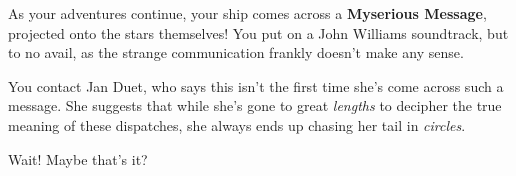 As your adventures continue, your ship comes across a \textbf{Myserious
Message}, projected onto the stars themselves! You put on a John
Williams soundtrack, but to no avail, as the strange communication
frankly doesn't make any sense.

You contact Jan Duet, who says this isn't the first time she's
come across such a message. She suggests that while she's gone
to great \textit{lengths} to decipher the true meaning of
these dispatches, she always ends up chasing her tail in
\textit{circles}.

Wait! Maybe that's it? 
